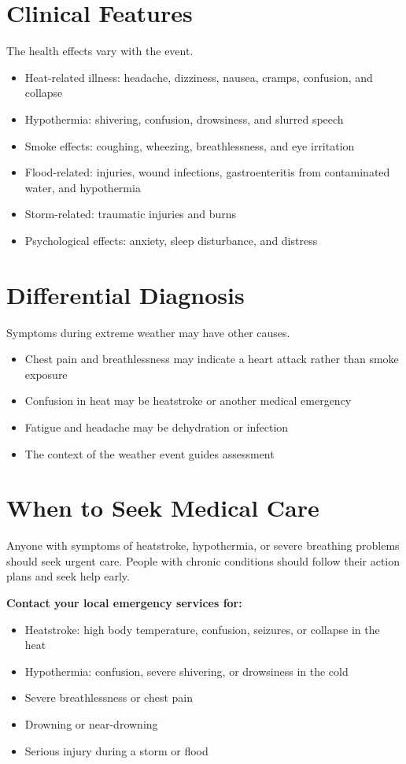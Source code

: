 \section*{Clinical Features}
The health effects vary with the event.
\begin{itemize}
    \item Heat-related illness: headache, dizziness, nausea, cramps, confusion, and collapse
    \item Hypothermia: shivering, confusion, drowsiness, and slurred speech
    \item Smoke effects: coughing, wheezing, breathlessness, and eye irritation
    \item Flood-related: injuries, wound infections, gastroenteritis from contaminated water, and hypothermia
    \item Storm-related: traumatic injuries and burns
    \item Psychological effects: anxiety, sleep disturbance, and distress
\end{itemize}

\section*{Differential Diagnosis}
Symptoms during extreme weather may have other causes.
\begin{itemize}
    \item Chest pain and breathlessness may indicate a heart attack rather than smoke exposure
    \item Confusion in heat may be heatstroke or another medical emergency
    \item Fatigue and headache may be dehydration or infection
    \item The context of the weather event guides assessment
\end{itemize}

\section*{When to Seek Medical Care}
Anyone with symptoms of heatstroke, hypothermia, or severe breathing problems should seek urgent care. People with chronic conditions should follow their action plans and seek help early.

\textbf{Contact your local emergency services for:}
\begin{itemize}
    \item Heatstroke: high body temperature, confusion, seizures, or collapse in the heat
    \item Hypothermia: confusion, severe shivering, or drowsiness in the cold
    \item Severe breathlessness or chest pain
    \item Drowning or near-drowning
    \item Serious injury during a storm or flood
\end{itemize}

